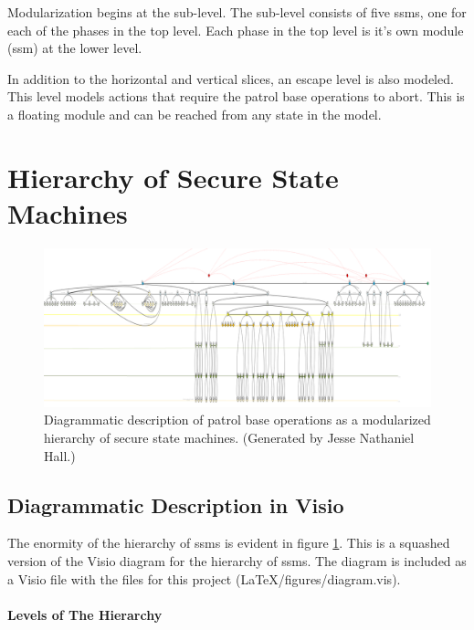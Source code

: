 \documentclass[../../main/main.tex]{subfiles}
\begin{document}
Modularization begins at the sub-level.  The sub-level consists of five \gls{ssm}s, one for each of the phases in the top level.  Each phase in the top level is it's own module (\gls{ssm}) at the lower level.  

In addition to the horizontal and vertical slices, an escape level is also modeled.  This level models actions that require the patrol base operations to abort.  This is a floating module and can be reached from any state in the model.  


\section{Hierarchy of Secure State Machines}
\begin{figure}[h]
\includegraphics[width=\textwidth]{../figures/overalldiagramsquashed}
\caption{\label{overalldiagramsquashed}Diagrammatic description of patrol base operations as a modularized hierarchy of secure state machines.  (Generated by Jesse Nathaniel Hall.)}
\end{figure}

\subsection{Diagrammatic Description in Visio}\label{ssec:overalldiagram}
The enormity of the hierarchy of \gls{ssm}s is evident in figure \ref{overalldiagramsquashed}.  This is a squashed version of the Visio diagram for the hierarchy of \gls{ssm}s. The diagram is included as a Visio file with the files for this project (LaTeX/figures/diagram.vis).  

\paragraph*{Levels of The Hierarchy}
\end{document}
